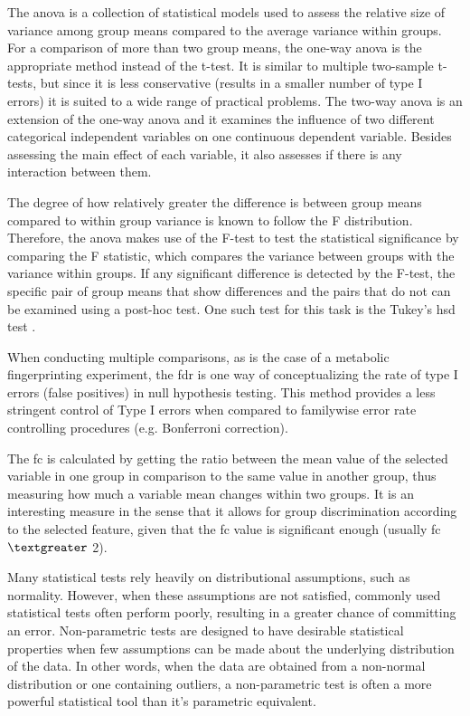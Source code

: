 The \gls{anova} is a collection of statistical models used to assess the relative size of variance among group means compared to the average variance within groups. For a comparison of more than two group means, the one-way \gls{anova} is the appropriate method instead of the t-test. It is similar to multiple two-sample t-tests, but since it is less conservative (results in a smaller number of type I errors) it is suited to a wide range of practical problems. The two-way \gls{anova} is an extension of the one-way \gls{anova} and it examines the influence of two different categorical independent variables on one continuous dependent variable. Besides assessing the main effect of each variable, it also assesses if there is any interaction between them.

The degree of how relatively greater the difference is between group means compared to within group variance is known to follow the F distribution. Therefore, the \gls{anova}  makes use of the F-test to test the statistical significance by comparing the F statistic, which compares the variance between groups with the variance within groups. If any significant difference is detected by the F-test, the specific pair of group means that show differences and the pairs that do not can be examined using a post-hoc test. One such test for this task is the Tukey's \gls{hsd} test \citep{kim2014analysis}.

When conducting multiple comparisons, as is the case of a metabolic fingerprinting experiment, the \gls{fdr} is one way of conceptualizing the rate of type I errors (false positives) in null hypothesis testing. This method provides a less stringent control of Type I errors when compared to familywise error rate controlling procedures (e.g. Bonferroni correction).

The \gls{fc} is calculated by getting the ratio between the mean value of the selected variable in one group in comparison to the same value in another group, thus measuring how much a variable mean changes within two groups. It is an interesting measure in the sense that it allows for group discrimination according to the selected feature, given that the \gls{fc} value is significant enough (usually \gls{fc} $ \textgreater $ 2).

Many statistical tests rely heavily on distributional assumptions, such as normality. However, when these assumptions are not satisfied, commonly used statistical tests often perform poorly, resulting in a greater chance of committing an error. Non-parametric tests are designed to have desirable statistical properties when few assumptions can be made about the underlying distribution of the data. In other words, when the data are obtained from a non-normal distribution or one containing outliers, a non-parametric test is often a more powerful statistical tool than it's parametric equivalent.

